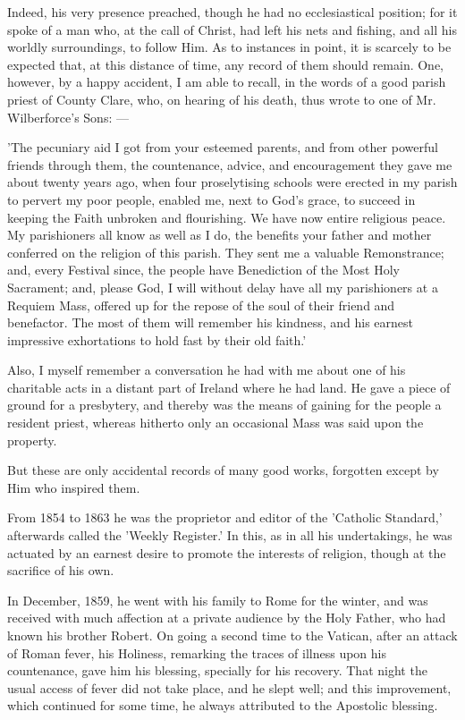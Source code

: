 Indeed, his very presence preached, though he had
no ecclesiastical position; for it spoke of a man who, at the call of
Christ, had left his nets and fishing, and all his worldly
surroundings, to follow Him. As to instances in point, it is scarcely
to be expected that, at this distance of time, any record of them
should remain. One, however, by a happy accident, I am able to recall,
in the words of a good parish priest of County Clare, who, on hearing
of his death, thus wrote to one of Mr. Wilberforce's Sons: —

'The pecuniary aid I got from your esteemed
parents, and from other powerful friends through them, the
countenance, advice, and encouragement they gave me about twenty years
ago, when four proselytising schools were erected in my parish to
pervert my poor people, enabled me, next to God's grace, to succeed
in keeping the Faith unbroken and flourishing. We have now entire
religious peace. My parishioners all know as well as I do, the
benefits your father and mother conferred on the religion of this
parish. They sent me a valuable Remonstrance; and, every Festival
since, the people have Benediction of the Most Holy Sacrament; and,
please God, I will without delay have all my parishioners at a Requiem
Mass, offered up for the repose of the soul of their friend and
benefactor. The most of them will remember his kindness, and his
earnest impressive exhortations to hold fast by their old faith.'

Also, I myself remember a conversation he had
with me about one of his charitable acts in a distant part of Ireland where he had land. He gave a piece of ground for a presbytery,
and thereby was the means of gaining for the people a resident priest,
whereas hitherto only an occasional Mass was said upon the property.

But these are only accidental records of many
good works, forgotten except by Him who inspired them.

From 1854 to 1863 he was the proprietor and
editor of the 'Catholic Standard,' afterwards called the 'Weekly
Register.' In this, as in all his undertakings, he was actuated by
an earnest desire to promote the interests of religion, though at the
sacrifice of his own.

In December, 1859, he went with his family to
Rome for the winter, and was received with much affection at a private
audience by the Holy Father, who had known his brother Robert. On
going a second time to the Vatican, after an attack of Roman fever,
his Holiness, remarking the traces of illness upon his countenance,
gave him his blessing, specially for his recovery. That night the
usual access of fever did not take place, and he slept well; and this
improvement, which continued for some time, he always attributed to
the Apostolic blessing.

